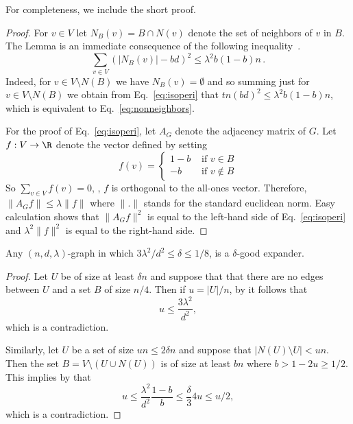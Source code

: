 \documentclass{toc}
\begin{document}
For completeness, we include the short proof.

\begin{proof}
For $v\in V$ let $N_B(v)=B\cap N(v)$ denote the set of neighbors
of $v$ in $B$.  The Lemma is an immediate consequence of the
following inequality~\cite[Theorem 1]{ABNNR}.
\begin{equation} \label{eq:isoperi}
\sum_{v\in V}\left(|N_B(v)|-bd\right)^2 \le \lambda^2 b(1-b)n\,.
\end{equation}
Indeed, for $v\in V \setminus N(B)$ we have $N_B(v)=\emptyset$
and so summing just for $v\in V \setminus N(B)$ we obtain
from Eq.~\eqref{eq:isoperi} that $tn(bd)^2\le \lambda^2 b(1-b)n$,
which is equivalent to Eq.~\eqref{eq:nonneighbors}.

\noindent
For the proof of Eq.~\eqref{eq:isoperi},
let $A_G$ denote the adjacency matrix of $G$.
Let $f : V\to\R$ denote the vector defined by setting
$$f(v)=\begin{cases} 1-b & \text{ if } v\in B\\
                     -b & \text{ if } v\notin B
        \end{cases} 
$$
So $\sum_{v\in V} f(v)=0$, \ie, $f$ is orthogonal to the 
all-ones vector.  Therefore, $\|A_Gf\|\le \lambda \|f\|$ where
$\|.\|$ stands for the standard euclidean norm.  Easy calculation
shows that $\|A_Gf\|^2$ is equal to the left-hand side of
Eq.~\eqref{eq:isoperi} and $\lambda^2\|f\|^2$ is equal to the 
right-hand side.
\end{proof}
%
%
%
%
%

\begin{lemma} \label{lem:good_expanders} 
Any $(n,d,\lambda)$-graph
in which ${3 \lambda^2}/{d^2} \leq \delta \leq 1/8$, is a 
$\delta$-good expander.
\end{lemma} 

\begin{proof}
Let $U$ be of size at least $\delta n$ and suppose that that there are no edges between 
$U$ and a set $B$ of size $n/4$. Then if $u = |U|/n$, by 
 it follows that 
\[
u \leq \frac{3 \lambda^2}{d^2},
\]
which is a contradiction. 

Similarly, let $U$ be a set of size  $ u n \leq 2 \delta n$ and suppose that 
$|N(U) \setminus U| < u n$. Then the set $B = V \setminus 
(U \cup N(U))$ is of size 
at least $b n$ where $b > 1- 2 u \geq 1/2$. 
This implies by  that
\[
u \leq \frac{\lambda^2}{d^2} \frac{1-b}{b} \leq \frac{\delta}{3} 4 u \leq u/2,
\]
which is a contradiction.
\end{proof} 
\end{document}
